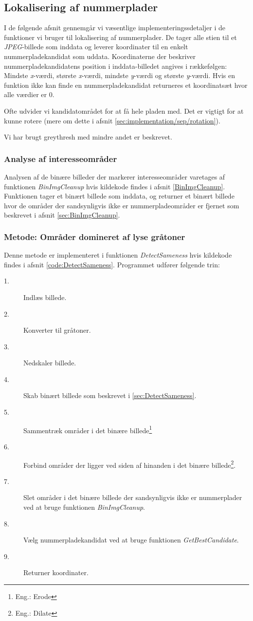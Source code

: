 
\subsection{Lokalisering af nummerplader}
I de følgende afsnit gennemgår vi væsentlige implementeringssdetaljer i de funktioner vi bruger til lokalisering af nummerplader. De tager alle stien til et \textit{JPEG}-billede som inddata og leverer koordinater til en enkelt nummerpladekandidat som uddata. Koordinaterne der beskriver nummerpladekandidatens position i inddata-billedet angives i rækkefølgen: Mindste \textit{x}-værdi, største \textit{x}-værdi, mindste \textit{y}-værdi og største \textit{y}-værdi. Hvis en funktion ikke kan finde en nummerpladekandidat returneres et koordinatsæt hvor alle værdier er $0$.

Ofte udvider vi kandidatområdet for at få hele pladen med. Det er vigtigt for at kunne rotere (mere om dette i afsnit \vref{sec:implementation/sep/rotation}).

Vi har brugt greythresh med mindre andet er beskrevet.

\subsubsection{Analyse af interesseområder}
Analysen af de binære billeder der markerer interesseområder varetages af funktionen \textit{BinImgCleanup} hvis kildekode findes i afsnit \vref{BinImgCleanup}. Funktionen tager et binært billede som inddata, og returner et binært billede hvor de områder der sandsynligvis ikke er nummerpladeområder er fjernet som beskrevet i afsnit \vref{sec:BinImgCleanup}. 


\subsubsection{Metode: Områder domineret af lyse gråtoner}
Denne metode er implementeret i funktionen \textit{DetectSameness} hvis kildekode findes i afsnit \vref{code:DetectSameness}. Programmet udfører følgende trin:

\begin{description}
\item[1.] Indlæs billede.
\item[2.] Konverter til gråtoner.
\item[3.] Nedskaler billede.
\item[4.] Skab binært billede som beskrevet i \ref{sec:DetectSameness}.
\item[5.] Sammentræk områder i det binære billede\footnote{Eng.: Erode}
\item[6.] Forbind områder der ligger ved siden af hinanden i det binære billede\footnote{Eng.: Dilate}.
\item[7.] Slet områder i det binære billede der sandsynligvis ikke er nummerplader ved at bruge funktionen \textit{BinImgCleanup}.
\item[8.] Vælg nummerpladekandidat ved at bruge funktionen \textit{GetBestCandidate}.
\item[9.] Returner koordinater.
\end{description}

